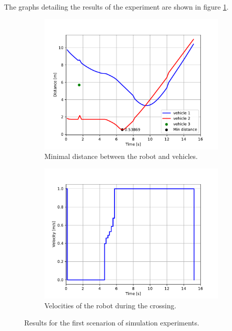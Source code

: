             The graphs detailing the results of the experiment are shown in figure \ref{fig:scene1_graphs}.
            \begin{figure}[ht]
                \centering
                \begin{subfigure}{0.49\linewidth}
                    \centering
                    \includegraphics[trim={24 8 40 41}, clip, width=\linewidth]{images/simulations/scene1_dist.pdf}
                    \caption{Minimal distance between the robot and vehicles.}
                \end{subfigure}
                \begin{subfigure}{0.49\linewidth}
                    \centering
                    \includegraphics[trim={21 8 40 41}, clip, width=\linewidth]{images/simulations/scene1_vel.pdf}
                    \caption{Velocities of the robot during the crossing.}
                \end{subfigure}
                \caption{Results for the first scenarion of simulation experiments.}
                \label{fig:scene1_graphs}
            \end{figure}
